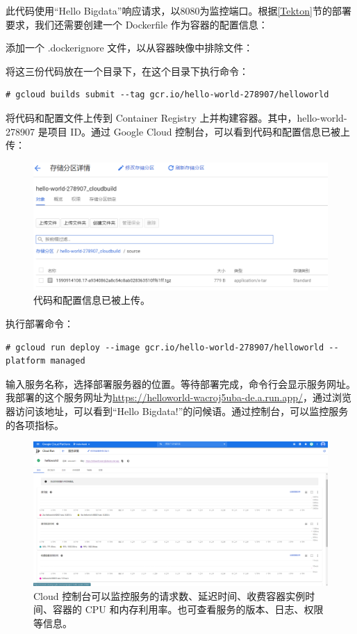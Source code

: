 \documentclass[11pt]{article}
\begin{document}
此代码使用“Hello Bigdata”响应请求，以8080为监控端口。根据\ref{Tekton}节的部署要求，我们还需要创建一个 Dockerfile 作为容器的配置信息：


添加一个 .dockerignore 文件，以从容器映像中排除文件：


将这三份代码放在一个目录下，在这个目录下执行命令：
\begin{lstlisting}
# gcloud builds submit --tag gcr.io/hello-world-278907/helloworld
\end{lstlisting}
将代码和配置文件上传到 Container Registry 上并构建容器。其中，hello-world-278907 是项目 ID。通过 Google Cloud 控制台，可以看到代码和配置信息已被上传：
\begin{figure}[!htbp]
	\centering
	\includegraphics[width=1.0\textwidth]{figs/cloudrun_submit.png}
	\caption{代码和配置信息已被上传。}
	\label{cloudrun_submit.png}
\end{figure}

执行部署命令：
\begin{lstlisting}
# gcloud run deploy --image gcr.io/hello-world-278907/helloworld --platform managed
\end{lstlisting}
输入服务名称，选择部署服务器的位置。等待部署完成，命令行会显示服务网址。我部署的这个服务网址为\url{https://helloworld-wacroj5uba-de.a.run.app/}，通过浏览器访问该地址，可以看到“Hello Bigdata!”的问候语。通过控制台，可以监控服务的各项指标。
\begin{figure}[!htbp]
	\centering
	\includegraphics[width=1.0\textwidth]{figs/cloudrun_complete.png}
	\caption{Cloud 控制台可以监控服务的请求数、延迟时间、收费容器实例时间、容器的 CPU 和内存利用率。也可查看服务的版本、日志、权限等信息。}
	\label{cloudrun_complete.png}
\end{figure}
\end{document}
